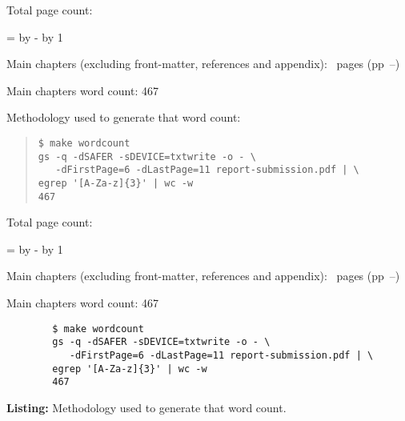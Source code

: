 \ifsubmission

\begin{defaultsffamily} %
Total page count: \pageref{LastPage}

\makeatletter
\@tempcnta=\relax%
\advance\@tempcnta by -%
\advance\@tempcnta by 1%
\xdef\contentpages{\the\@tempcnta}%
\makeatother

Main chapters (excluding front-matter, references and appendix):
\contentpages~pages
(pp~\pageref{firstcontentpage}--\pageref{lastcontentpage})

Main chapters word count: 467

\vspace*{1em}
Methodology used to generate that word count:

\begin{quote}
\begin{verbatim}
$ make wordcount
gs -q -dSAFER -sDEVICE=txtwrite -o - \
   -dFirstPage=6 -dLastPage=11 report-submission.pdf | \
egrep '[A-Za-z]{3}' | wc -w
467
\end{verbatim}
\end{quote}

\end{defaultsffamily}
\vspace{\fill}
\onehalfspacing




\else


Total page count: \pageref{LastPage}

\makeatletter
\@tempcnta=\getpagerefnumber{lastcontentpage}\relax%
\advance\@tempcnta by -%
\advance\@tempcnta by 1%
\xdef\contentpages{\the\@tempcnta}%
\makeatother

Main chapters (excluding front-matter, references and appendix):
\contentpages~pages
(pp~\pageref{firstcontentpage}--\pageref{lastcontentpage})

Main chapters word count: 467

\vspace*{2em}
\begin{code}
    \begin{verbatim}
        $ make wordcount
        gs -q -dSAFER -sDEVICE=txtwrite -o - \
           -dFirstPage=6 -dLastPage=11 report-submission.pdf | \
        egrep '[A-Za-z]{3}' | wc -w
        467
    \end{verbatim}
    \captionsetup{textfont=sf}
    \caption*{\textbf{Listing:} Methodology used to generate that word count.}
\end{code}



